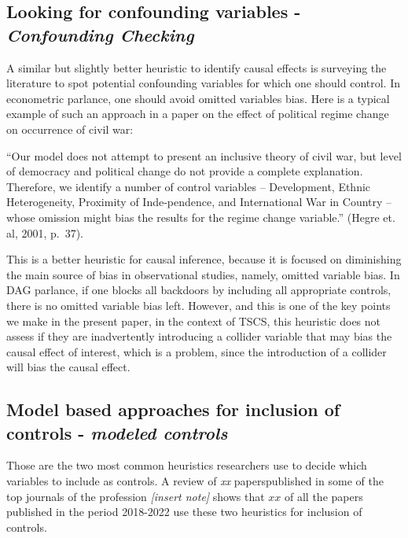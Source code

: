 \documentclass[
  super,
  preprint,
  3p]{elsarticle}
\begin{document}
\hypertarget{looking-for-confounding-variables---confounding-checking}{%
\subsection{\texorpdfstring{Looking for confounding variables -
\emph{Confounding
Checking}}{Looking for confounding variables - Confounding Checking}}\label{looking-for-confounding-variables---confounding-checking}}

A similar but slightly better heuristic to identify causal effects is
surveying the literature to spot potential confounding variables for
which one should control. In econometric parlance, one should avoid
omitted variables bias. Here is a typical example of such an approach in
a paper on the effect of political regime change on occurrence of civil
war:

``Our model does not attempt to present an inclusive theory of civil
war, but level of democracy and political change do not provide a
complete explanation. Therefore, we identify a number of control
variables -- Development, Ethnic Heterogeneity, Proximity of
Inde-pendence, and International War in Country -- whose omission might
bias the results for the regime change variable.'' (Hegre et. al, 2001,
p.~37).

This is a better heuristic for causal inference, because it is focused
on diminishing the main source of bias in observational studies, namely,
omitted variable bias. In DAG parlance, if one blocks all backdoors by
including all appropriate controls, there is no omitted variable bias
left. However, and this is one of the key points we make in the present
paper, in the context of TSCS, this heuristic does not assess if they
are inadvertently introducing a collider variable that may bias the
causal effect of interest, which is a problem, since the introduction of
a collider will bias the causal effect.

\hypertarget{model-based-approaches-for-inclusion-of-controls---modeled-controls}{%
\subsection{\texorpdfstring{Model based approaches for inclusion of
controls - \emph{modeled
controls}}{Model based approaches for inclusion of controls - modeled controls}}\label{model-based-approaches-for-inclusion-of-controls---modeled-controls}}

Those are the two most common heuristics researchers use to decide which
variables to include as controls. A review of \emph{xx} paperspublished
in some of the top journals of the profession \emph{{[}insert note{]}}
shows that \(xx%
\) of all the papers published in the period 2018-2022 use these two
heuristics for inclusion of controls.
\end{document}
